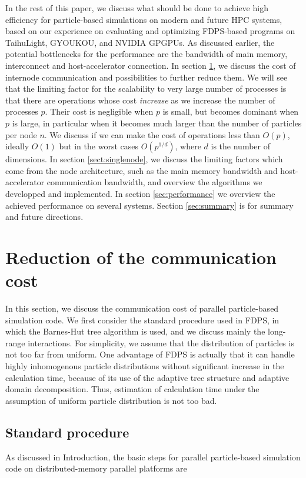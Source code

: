 In the rest of this paper, we discuss what should be done to achieve
high efficiency for particle-based simulations on modern and future
HPC systems, based on our experience on evaluating and optimizing
FDPS-based programs on TaihuLight,  GYOUKOU, and NVIDIA GPGPUs.
As discussed earlier, the potential bottlenecks for the performance
are the bandwidth of main memory, interconnect and host-accelerator
connection. 
In section \ref{sec:communicationcost}, we discuss the cost of
internode communication and  possibilities to further reduce them.
We will see that the limiting factor for the scalability to very large
number of processes is that there are operations whose cost {\it
  increase}  as we increase the number of processes $p$. Their cost is
negligible when $p$ is small, but becomes dominant when $p$ is large,
in particular when it becomes  much larger than the number of
particles per node $n$. We discuss if we can make the cost of
operations less than $O(p)$, ideally $O(1)$ but in the worst cases
$O(p^{1/d})$, where $d$ is the number of dimensions.
In section \ref{sect:singlenode}, we discuss the limiting
factors which come from the node architecture,  such as the main memory bandwidth
and host-accelerator communication bandwidth, and overview the
algorithms we developped and implemented.
In
section \ref{sec:performance} we overview the achieved performance on
several systems. Section
\ref{sec:summary} is for summary and future directions.


\section{Reduction of the communication cost}
\label{sec:communicationcost}

In this section, we discuss the communication cost of 
parallel particle-based simulation code. 
We first consider the  standard procedure used  in FDPS, in which the
Barnes-Hut tree algorithm  is used, and we discuss mainly the
long-range interactions. For simplicity, we assume that the
distribution of particles is not too far from uniform. One advantage
of FDPS is actually that it can handle highly inhomogenous particle
distributions without significant increase in the calculation time,
because of its use of the adaptive tree structure and adaptive domain
decomposition. Thus, estimation of calculation time under the
assumption of uniform particle distribution is not too bad.

\subsection{Standard procedure}
As discussed in Introduction, the basic steps for parallel
particle-based simulation code on distributed-memory parallel
platforms are


